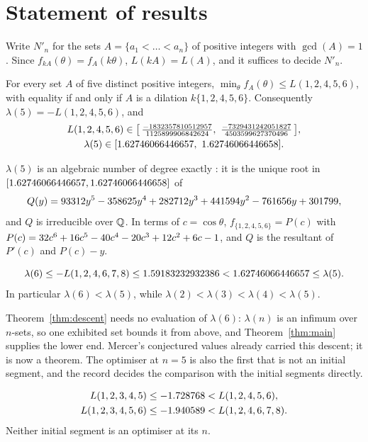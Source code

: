 \documentclass[11pt]{article}
\newcommand{\Lf}{L(1,2,4,5,6)}
\newcommand{\Ls}{L(1,2,4,6,7,8)}
\begin{document}
\section{Statement of results}\label{sec:results}

Write $N'_n$ for the sets $A=\{a_1<\dots<a_n\}$ of positive integers with $\gcd(A)=1$. Since $f_{kA}(\theta)=f_A(k\theta)$, $L(kA)=L(A)$, and it suffices to decide $N'_n$.

\begin{theorem}\label{thm:main}
For every set $A$ of five distinct positive integers, $\min_\theta f_A(\theta)\le\Lf$, with equality if and only if $A$ is a dilation $k\{1,2,4,5,6\}$. Consequently $\lambda(5)=-\Lf$, and
\begin{gather*}
\Lf\in\bigl[\,\LfiveRatLo,\ \LfiveRatHi\,\bigr],\\
\lambda(5)\in[\LamFiveLo,\ \LamFiveHi].
\end{gather*}
\end{theorem}

\begin{theorem}\label{thm:value}
$\lambda(5)$ is an algebraic number of degree exactly \QuinticDegree: it is the unique root in $[1.62746066446657,1.62746066446658]$ of
\[
Q(y)=93312y^{5} - 358625y^{4} + 282712y^{3} + 441594y^{2} - 761656y + 301799 ,
\]
and $Q$ is irreducible over $\mathbb{Q}$. In terms of $c=\cos\theta$, $f_{\{1,2,4,5,6\}}=P(c)$ with $P(c)=32c^{6} + 16c^{5} - 40c^{4} - 20c^{3} + 12c^{2} + 6c - 1$, and $Q$ is the resultant of $P'(c)$ and $P(c)-y$.
\end{theorem}

\begin{theorem}\label{thm:descent}
\[
\lambda(6)\le-\Ls\le\LamSixUp<\LamFiveLo\le\lambda(5).
\]
In particular $\lambda(6)<\lambda(5)$, while $\lambda(2)<\lambda(3)<\lambda(4)<\lambda(5)$.
\end{theorem}

Theorem~\ref{thm:descent} needs no evaluation of $\lambda(6)$: $\lambda(n)$ is an infimum over $n$-sets, so one exhibited set bounds it from above, and Theorem~\ref{thm:main} supplies the lower end. Mercer's conjectured values already carried this descent; it is now a theorem. The optimiser at $n=5$ is also the first that is not an initial segment, and the record decides the comparison with the initial segments directly.

\begin{proposition}\label{prop:seg}
\begin{gather*}
L(1,2,3,4,5)\le-\SegFiveLo<\Lf,\\
L(1,2,3,4,5,6)\le-\SegSixLo<\Ls .
\end{gather*}
Neither initial segment is an optimiser at its $n$.
\end{proposition}
\end{document}
